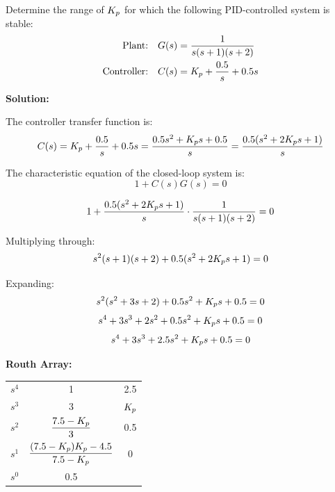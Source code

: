 \begin{example}
\label{ex:stability_analysis}
Determine the range of $K_p$ for which the following PID-controlled system is stable:
\begin{align*}
\text{Plant:} \quad G(s) &= \frac{1}{s(s+1)(s+2)} \\
\text{Controller:} \quad C(s) &= K_p + \frac{0.5}{s} + 0.5s
\end{align*}

\textbf{Solution:}

The controller transfer function is:
\begin{equation*}
C(s) = K_p + \frac{0.5}{s} + 0.5s = \frac{0.5s^2 + K_p s + 0.5}{s} = \frac{0.5(s^2 + 2K_p s + 1)}{s}
\end{equation*}

The characteristic equation of the closed-loop system is:
\begin{equation*}
1 + C(s)G(s) = 0
\end{equation*}

\begin{equation*}
1 + \frac{0.5(s^2 + 2K_p s + 1)}{s} \cdot \frac{1}{s(s+1)(s+2)} = 0
\end{equation*}

Multiplying through:
\begin{equation*}
s^2(s+1)(s+2) + 0.5(s^2 + 2K_p s + 1) = 0
\end{equation*}

Expanding:
\begin{equation*}
s^2(s^2 + 3s + 2) + 0.5s^2 + K_p s + 0.5 = 0
\end{equation*}
\begin{equation*}
s^4 + 3s^3 + 2s^2 + 0.5s^2 + K_p s + 0.5 = 0
\end{equation*}
\begin{equation*}
s^4 + 3s^3 + 2.5s^2 + K_p s + 0.5 = 0
\end{equation*}

\textbf{Routh Array:}
\begin{center}
\begin{tabular}{c|cc}
$s^4$ & 1 & 2.5 \\
$s^3$ & 3 & $K_p$ \\
$s^2$ & $\dfrac{7.5 - K_p}{3}$ & 0.5 \\
$s^1$ & $\dfrac{(7.5-K_p)K_p - 4.5}{7.5 - K_p}$ & 0 \\
$s^0$ & 0.5 & \\
\end{tabular}
\end{center}


\end{example}
